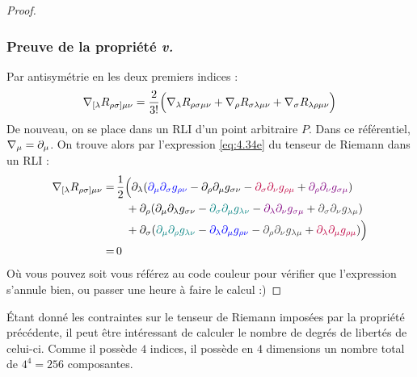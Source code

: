 \begin{proof}
    \subsubsection{Preuve de la propriété \emph{v.}}
        Par antisymétrie en les deux premiers indices :
        \begin{equation}
            \nabla_{[\lambda}R_{\rho \sigma]\mu \nu} = \frac{2}{3!} \Bigl(\nabla_{\lambda}R_{\rho \sigma \mu \nu} + \nabla_{\rho}R_{\sigma \lambda \mu \nu} + \nabla_{\sigma}R_{\lambda \rho \mu \nu}\Bigr)
        \end{equation}
        De nouveau, on se place dans un RLI d'un point arbitraire $P$. Dans ce référentiel, $\nabla_\mu = \partial_\mu$. On trouve alors par l'expression \ref{eq:4.34e} du tenseur de Riemann dans un RLI :
        \begin{align}
            \nabla_{[\lambda}R_{\rho \sigma]\mu \nu} =&\, \frac{1}{2}\Bigl(\partial_{\lambda}(\textcolor{blue}{\partial_{\mu}\partial_{\sigma}g_{\rho \nu}} - \partial_{\rho}\partial_{\mu}g_{\sigma \nu} - \textcolor{purple}{\partial_{\sigma}\partial_{\nu}g_{\rho \mu}} + \textcolor{violet}{\partial_{\rho}\partial_{\nu}g_{\sigma \mu}}) \\
            & \quad+ \partial_{\rho}(\partial_{\mu}\partial_{\lambda}g_{\sigma \nu} - \textcolor{teal}{\partial_{\sigma}\partial_{\mu}g_{\lambda \nu}} - \textcolor{violet}{\partial_{\lambda}\partial_{\nu}g_{\sigma \mu} }
            + \textcolor{darkgray}{\partial_{\sigma}\partial_{\nu}g_{\lambda \mu}}) \\
            & \quad+\partial_{\sigma}(\textcolor{teal}{\partial_{\mu}\partial_{\rho}g_{\lambda \nu}} - \textcolor{blue}{\partial_{\lambda}\partial_{\mu}g_{\rho \nu}} - \textcolor{darkgray}{\partial_{\rho}\partial_{\nu}g_{\lambda \mu}} + \textcolor{purple}{\partial_{\lambda}\partial_{\mu}g_{\rho \mu}})\Bigr)\\
            =& \,0
        \end{align}
        Où vous pouvez soit vous référez au code couleur pour vérifier que l'expression s'annule bien, ou passer une heure à faire le calcul :)
\end{proof}
Étant donné les contraintes sur le tenseur de Riemann imposées par la propriété précédente, il peut être intéressant de calculer le nombre de degrés de libertés de celui-ci. Comme il possède $4$ indices, il possède en $4$ dimensions un nombre total de $4^4 = 256$ composantes. 

